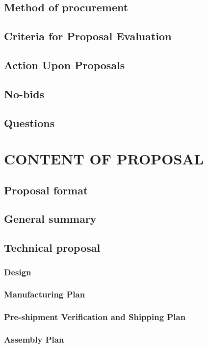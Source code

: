 \documentclass[12pt,letter]{article}
\begin{document}
\subsection{Method of procurement}

\subsection{Criteria for Proposal Evaluation}
\subsection{Action Upon Proposals}
\subsection{No-bids}
\subsection{Questions}

\section{CONTENT OF PROPOSAL}
\subsection{Proposal format}
\subsection{General summary}
\subsection{Technical proposal}
	\subsubsection{Design}
    \subsubsection{Manufacturing Plan}
    \subsubsection{Pre-shipment Verification and Shipping Plan}
    \subsubsection{Assembly Plan}
\end{document}

